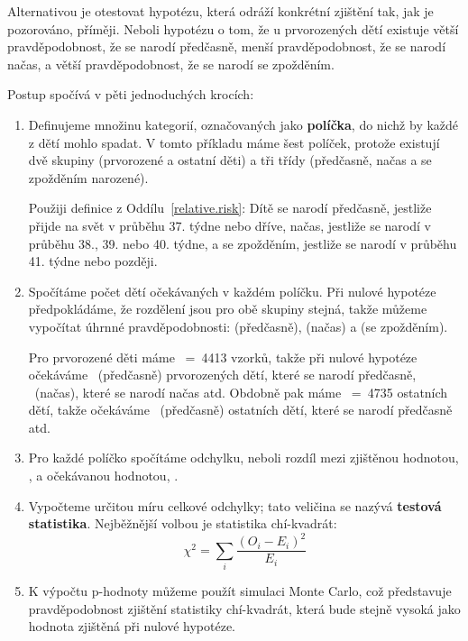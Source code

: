\documentclass[12pt]{book}
\begin{document}
Alternativou je otestovat hypotézu, která odráží konkrétní zjištění tak, jak je pozorováno, příměji. Neboli hypotézu o tom, že u prvorozených dětí existuje větší pravděpodobnost, že se narodí předčasně, menší pravděpodobnost, že se narodí načas, a větší pravděpodobnost, že se narodí se zpožděním.

Postup spočívá v pěti jednoduchých krocích:

\begin{enumerate}

\item Definujeme množinu kategorií, označovaných jako {\bf políčka}, do nichž by každé z dětí mohlo spadat. V tomto příkladu máme šest políček, protože existují dvě skupiny (prvorozené a ostatní děti) a tři třídy (předčasně, načas a se zpožděním narozené).

Použiji definice z Oddílu~\ref{relative.risk}: Dítě se narodí předčasně, jestliže přijde na svět v průběhu 37. týdne nebo dříve, načas, jestliže se narodí v průběhu 38., 39. nebo 40. týdne, a se zpožděním, jestliže se narodí v průběhu 41. týdne nebo později.

\item Spočítáme počet dětí očekávaných v každém políčku. Při nulové hypotéze předpokládáme, že rozdělení jsou pro obě skupiny stejná, takže můžeme vypočítat úhrnné pravděpodobnosti:
  \Prob(předčasně), \Prob(načas) a \Prob(se zpožděním).

Pro prvorozené děti máme \n~=~4413 vzorků, takže při nulové hypotéze očekáváme \n~\Prob(předčasně) prvorozených dětí, které se narodí předčasně, \n~\Prob(načas), které se narodí načas atd.  Obdobně pak máme \m~=~4735
ostatních dětí, takže očekáváme \m~\Prob(předčasně) ostatních dětí, které se narodí předčasně atd.

\item Pro každé políčko spočítáme odchylku, neboli rozdíl mezi zjištěnou hodnotou, \OO{}, a očekávanou hodnotou, \E{}.

\item Vypočteme určitou míru celkové odchylky; tato veličina se nazývá {\bf testová statistika}.  Nejběžnější volbou je statistika chí-kvadrát:
%
\[ \chi^2 = \sum_i \frac{(O_i - E_i)^2}{E_i} \]
%

\item K výpočtu p-hodnoty můžeme použít simulaci Monte Carlo, což představuje pravděpodobnost zjištění statistiky chí-kvadrát, která bude stejně vysoká jako hodnota zjištěná při nulové hypotéze.

\end{enumerate}
\end{document}
